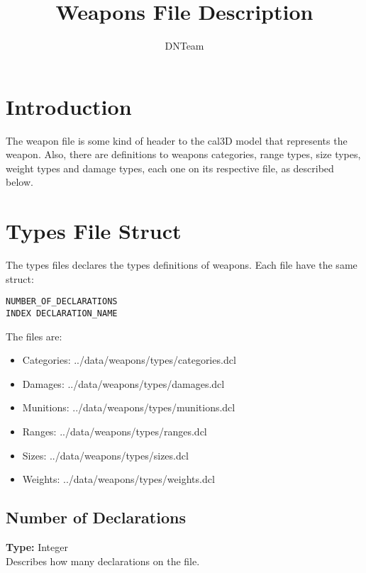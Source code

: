 \documentclass[letterpaper,12pt]{article}
\begin{document}
\title{Weapons File Description}

\author{
DNTeam
}

\maketitle


\newpage

\tableofcontents

\newpage

\section{Introduction}

  The weapon file is some kind of header to the cal3D model that represents
the weapon. Also, there are definitions to weapons categories, range types,
size types, weight types and damage types, each one on its respective file,
as described below.

\section{Types File Struct}

The types files declares the types definitions of weapons. Each file have the
same struct:

\begin{verbatim}
NUMBER_OF_DECLARATIONS
INDEX DECLARATION_NAME
\end{verbatim}

The files are:

\begin{itemize}
\item{Categories: ../data/weapons/types/categories.dcl}
\item{Damages: ../data/weapons/types/damages.dcl}
\item{Munitions: ../data/weapons/types/munitions.dcl}
\item{Ranges: ../data/weapons/types/ranges.dcl}
\item{Sizes: ../data/weapons/types/sizes.dcl}
\item{Weights: ../data/weapons/types/weights.dcl}
\end{itemize}

\subsection{Number of Declarations}
{\bf Type: }Integer\\
Describes how many declarations on the file.
\end{document}
